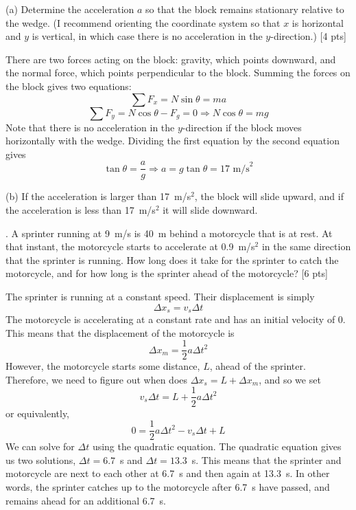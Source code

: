 \documentclass[11pt,letterpaper]{article}
\newcommand{\sol}[1]{{\color{NavyBlue} #1}}
\begin{document}
(a) Determine the acceleration $a$ so that the block remains stationary relative to the wedge. (I recommend orienting the coordinate system so that $x$ is horizontal and $y$ is vertical, in which case there is no acceleration in the $y$-direction.) [4 pts]

\sol{There are two forces acting on the block: gravity, which points downward, and the normal force, which points perpendicular to the block. Summing the forces on the block gives two equations:
\begin{equation}
\sum F_x = N\sin\theta = ma
\end{equation}
\begin{equation}
\sum F_y = N\cos\theta-F_g = 0 \Rightarrow N\cos\theta = mg
\end{equation}
Note that there is no acceleration in the $y$-direction if the block moves horizontally with the wedge. Dividing the first equation by the second equation gives
\begin{equation}
\tan\theta = \frac{a}{g} \Rightarrow \boxed{a=g\tan\theta = 17\mbox{ m/s}^2}
\end{equation}

(b) If the acceleration is larger than 17~m/s$^2$, the block will slide upward, and if the acceleration is less than 17~m/s$^2$ it will slide downward.

}

. A sprinter running at 9~m/s is 40~m behind a motorcycle that is at rest. At that instant, the motorcycle starts to accelerate at 0.9~m/s$^2$ in the same direction that the sprinter is running. How long does it take for the sprinter to catch the motorcycle, and for how long is the sprinter ahead of the motorcycle? [6 pts]

\sol{The sprinter is running at a constant speed. Their displacement is simply
\begin{equation}
\Delta x_s = v_s\Delta{t}
\end{equation}
The motorcycle is accelerating at a constant rate and has an initial velocity of 0. This means that the displacement of the motorcycle is
\begin{equation}
\Delta x_m = \frac{1}{2}a\Delta t^2
\end{equation}
However, the motorcycle starts some distance, $L$, ahead of the sprinter. Therefore, we need to figure out when does $\Delta x_s = L+\Delta x_m$, and so we set
\begin{equation}
v_s\Delta t = L + \frac{1}{2}a\Delta t^2
\end{equation}
or equivalently,
\begin{equation}
0 = \frac{1}{2}a\Delta t^2 - v_s\Delta t + L
\end{equation}
We can solve for $\Delta t$ using the quadratic equation. The quadratic equation gives us two solutions, $\Delta t = 6.7$~s and $\Delta t=13.3$~s. This means that the sprinter and motorcycle are next to each other at 6.7~s and then again at 13.3~s. In other words, the sprinter catches up to the motorcycle after 6.7~s have passed, and remains ahead for an additional 6.7~s.


}
\end{document}
